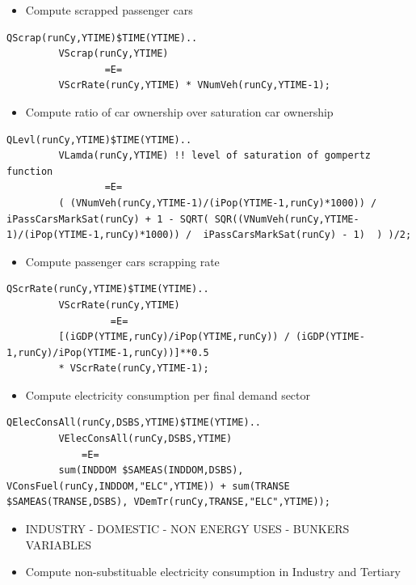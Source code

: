 \documentclass[a4paper,]{scrartcl}
\providecommand{\tightlist}{%
  \setlength{\itemsep}{0pt}\setlength{\parskip}{0pt}}
\begin{document}
\begin{itemize}
\tightlist
\item
  Compute scrapped passenger cars
\end{itemize}

\begin{lstlisting}
QScrap(runCy,YTIME)$TIME(YTIME)..
         VScrap(runCy,YTIME)
                 =E=
         VScrRate(runCy,YTIME) * VNumVeh(runCy,YTIME-1);
\end{lstlisting}

\begin{itemize}
\tightlist
\item
  Compute ratio of car ownership over saturation car ownership
\end{itemize}

\begin{lstlisting}
QLevl(runCy,YTIME)$TIME(YTIME)..
         VLamda(runCy,YTIME) !! level of saturation of gompertz function
                 =E=
         ( (VNumVeh(runCy,YTIME-1)/(iPop(YTIME-1,runCy)*1000)) / iPassCarsMarkSat(runCy) + 1 - SQRT( SQR((VNumVeh(runCy,YTIME-1)/(iPop(YTIME-1,runCy)*1000)) /  iPassCarsMarkSat(runCy) - 1)  ) )/2;
\end{lstlisting}

\begin{itemize}
\tightlist
\item
  Compute passenger cars scrapping rate
\end{itemize}

\begin{lstlisting}
QScrRate(runCy,YTIME)$TIME(YTIME)..
         VScrRate(runCy,YTIME)
                  =E=
         [(iGDP(YTIME,runCy)/iPop(YTIME,runCy)) / (iGDP(YTIME-1,runCy)/iPop(YTIME-1,runCy))]**0.5
         * VScrRate(runCy,YTIME-1);
\end{lstlisting}

\begin{itemize}
\tightlist
\item
  Compute electricity consumption per final demand sector
\end{itemize}

\begin{lstlisting}
QElecConsAll(runCy,DSBS,YTIME)$TIME(YTIME)..
         VElecConsAll(runCy,DSBS,YTIME)
             =E=
         sum(INDDOM $SAMEAS(INDDOM,DSBS), VConsFuel(runCy,INDDOM,"ELC",YTIME)) + sum(TRANSE $SAMEAS(TRANSE,DSBS), VDemTr(runCy,TRANSE,"ELC",YTIME));
\end{lstlisting}

\begin{itemize}
\tightlist
\item
  INDUSTRY - DOMESTIC - NON ENERGY USES - BUNKERS VARIABLES
\item
  Compute non-substituable electricity consumption in Industry and
  Tertiary
\end{itemize}
\end{document}
